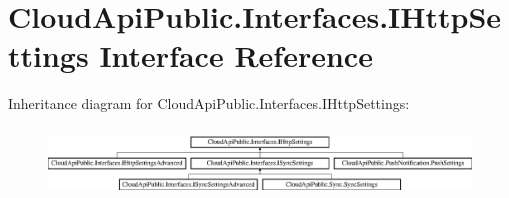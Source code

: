 \hypertarget{interface_cloud_api_public_1_1_interfaces_1_1_i_http_settings}{\section{Cloud\-Api\-Public.\-Interfaces.\-I\-Http\-Settings Interface Reference}
\label{interface_cloud_api_public_1_1_interfaces_1_1_i_http_settings}
}
Inheritance diagram for Cloud\-Api\-Public.\-Interfaces.\-I\-Http\-Settings\-:\begin{figure}[H]
\begin{center}
\leavevmode
\includegraphics[height=1.836066cm]{interface_cloud_api_public_1_1_interfaces_1_1_i_http_settings}
\end{center}
\end{figure}
